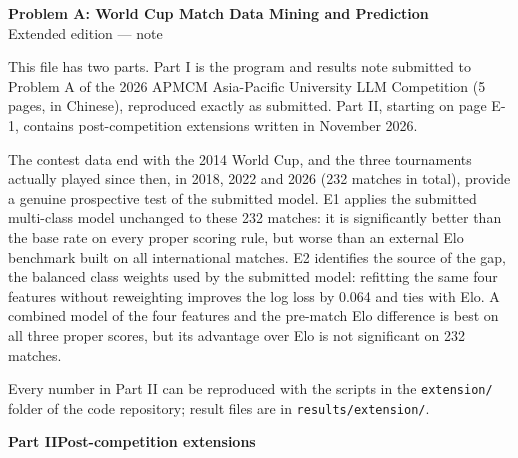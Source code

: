 
\graphicspath{{../../figures/extension/}}

\thispagestyle{empty}
\begin{center}
{\Large\bfseries Problem A: World Cup Match Data Mining and Prediction}\\[0.7em]
{\large Extended edition --- note}
\end{center}
\vspace{0.8em}

This file has two parts. Part I is the program and results note submitted to Problem A of the 2026 APMCM Asia-Pacific University LLM Competition (5 pages, in Chinese), reproduced exactly as submitted. Part II, starting on page E-1, contains post-competition extensions written in November 2026.

The contest data end with the 2014 World Cup, and the three tournaments actually played since then, in 2018, 2022 and 2026 (232 matches in total), provide a genuine prospective test of the submitted model. E1 applies the submitted multi-class model unchanged to these 232 matches: it is significantly better than the base rate on every proper scoring rule, but worse than an external Elo benchmark built on all international matches. E2 identifies the source of the gap, the balanced class weights used by the submitted model: refitting the same four features without reweighting improves the log loss by 0.064 and ties with Elo. A combined model of the four features and the pre-match Elo difference is best on all three proper scores, but its advantage over Elo is not significant on 232 matches.

Every number in Part II can be reproduced with the scripts in the \texttt{extension/} folder of the code repository; result files are in \texttt{results/extension/}.

\clearpage
{}

\setcounter{page}{1}
\begin{center}{\Large\bfseries Part II\quad Post-competition extensions}\end{center}

